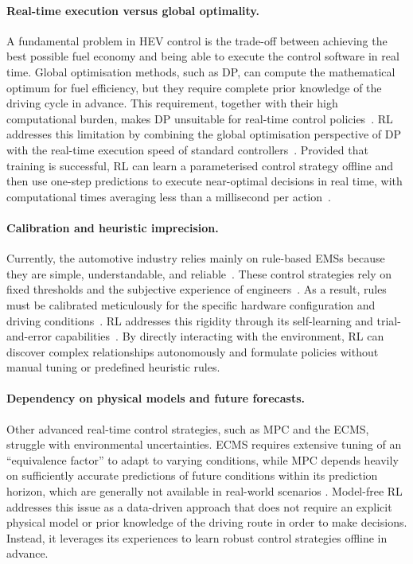 \paragraph{Real-time execution versus global optimality.}
A fundamental problem in HEV control is the trade-off between achieving the best possible fuel economy and being able to execute the control software in real time. Global optimisation methods, such as \ac{DP}, can compute the mathematical optimum for fuel efficiency, but they require complete prior knowledge of the driving cycle in advance. This requirement, together with their high computational burden, makes DP unsuitable for real-time control policies~\cite{enang_modelling_2017, serrao_comparative_2011}. RL addresses this limitation by combining the global optimisation perspective of DP with the real-time execution speed of standard controllers~\cite{xu_parametric_2020}. Provided that training is successful, RL can learn a parameterised control strategy offline and then use one-step predictions to execute near-optimal decisions in real time, with computational times averaging less than a millisecond per action~\cite{tang_double_2022}.

\paragraph{Calibration and heuristic imprecision.}
Currently, the automotive industry relies mainly on rule-based \acp{EMS} because they are simple, understandable, and reliable~\cite{peng_rule-based_2015, lin_progress_2024}. These control strategies rely on fixed thresholds and the subjective experience of engineers~\cite{peng_rule_2017, du_heuristic_2021}. As a result, rules must be calibrated meticulously for the specific hardware configuration and driving conditions~\cite{zhou_novel_2021}. RL addresses this rigidity through its self-learning and trial-and-error capabilities~\cite{sutton_reinforcement_2020}. By directly interacting with the environment, RL can discover complex relationships autonomously and formulate policies without manual tuning or predefined heuristic rules.

\paragraph{Dependency on physical models and future forecasts.}
Other advanced real-time control strategies, such as \ac{MPC} and the \ac{ECMS}, struggle with environmental uncertainties. \ac{ECMS} requires extensive tuning of an ``equivalence factor'' to adapt to varying conditions, while MPC depends heavily on sufficiently accurate predictions of future conditions within its prediction horizon, which are generally not available in real-world scenarios \cite{enang_modelling_2017, tan_energy_2019}. Model-free RL addresses this issue as a data-driven approach that does not require an explicit physical model or prior knowledge of the driving route in order to make decisions. Instead, it leverages its experiences to learn robust control strategies offline in advance.

